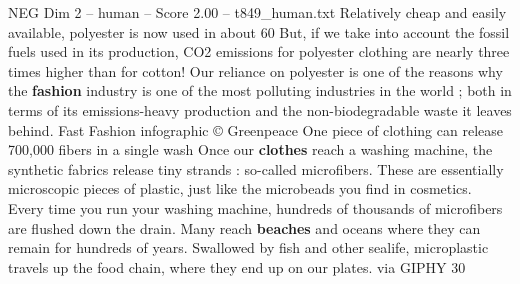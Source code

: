 \begin{textsample}{NEG Dim 2 – human – Score 2.00 – t849\_human.txt}
Relatively cheap and easily available, polyester is now used in about 60 %
But, if we take into account the fossil fuels used in its production, CO2 emissions for polyester clothing are nearly three times higher than for cotton!
Our reliance on polyester is one of the reasons why the \textbf{fashion} industry is one of the most polluting industries in the world ; both in terms of its emissions-heavy production and the non-biodegradable waste it leaves behind.
Fast Fashion infographic © Greenpeace One piece of clothing can release 700,000 fibers in a single wash Once our \textbf{clothes} reach a washing machine, the synthetic fabrics release tiny strands : so-called microfibers.
These are essentially microscopic pieces of plastic, just like the microbeads you find in cosmetics.
Every time you run your washing machine, hundreds of thousands of microfibers are flushed down the drain.
Many reach \textbf{beaches} and oceans where they can remain for hundreds of years.
Swallowed by fish and other sealife, microplastic travels up the food chain, where they end up on our plates. via GIPHY 30 %

\end{textsample}
